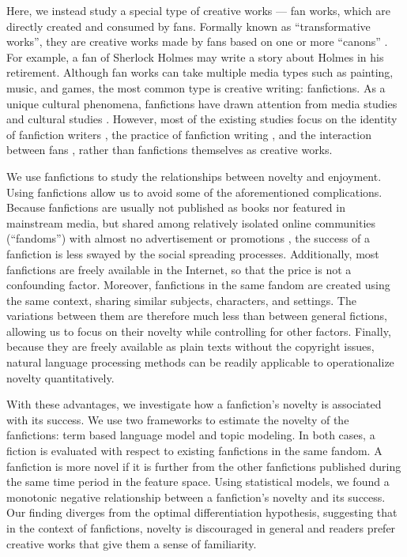 \documentclass[letterpaper]{article} %
\begin{document}
Here, we instead study a special type of creative works --- fan works, which are directly created and consumed by fans. Formally known as ``transformative works'', they are creative works made by fans based on one or more ``canons'' \cite{wiki:transf_work}. For example, a fan of Sherlock Holmes may write a story about Holmes in his retirement. Although fan works can take multiple media types such as painting, music, and games, the most common type is creative writing: fanfictions. As a unique cultural phenomena, fanfictions have drawn attention from media studies and cultural studies \cite{thomas2011fanfiction}. However, most of the existing studies focus on the identity of fanfiction writers \cite{black2006language}, the practice of fanfiction writing \cite{LIT:LIT12061}, and the interaction between fans \cite{hills2015expertise}, rather than fanfictions themselves as creative works.

We use fanfictions to study the relationships between novelty and enjoyment. Using fanfictions allow us to avoid some of the aforementioned complications. Because fanfictions are usually not published as books nor featured in mainstream media, but shared among relatively isolated online communities (``fandoms'') with almost no advertisement or promotions \cite{wiki:fandom}, the success of a fanfiction is less swayed by the social spreading processes. Additionally, most fanfictions are freely available in the Internet, so that the price is not a confounding factor. Moreover, fanfictions in the same fandom are created using the same context, sharing similar subjects, characters, and settings. The variations between them are therefore much less than between general fictions, allowing us to focus on their novelty while controlling for other factors. Finally, because they are freely available as plain texts without the copyright issues, natural language processing methods can be readily applicable to operationalize novelty quantitatively.

With these advantages, we investigate how a fanfiction's novelty is associated with its success. We use two frameworks to estimate the novelty of the fanfictions:  term based language model and topic modeling. In both cases, a fiction is evaluated with respect to existing fanfictions in the same fandom. A fanfiction is more novel if it is further from the other fanfictions published during the same time period in the feature space. Using statistical models, we found a monotonic negative relationship between a fanfiction's novelty and its success. Our finding diverges from the optimal differentiation hypothesis, suggesting that in the context of fanfictions, novelty is discouraged in general and readers prefer creative works that give them a sense of familiarity. 
\end{document}
